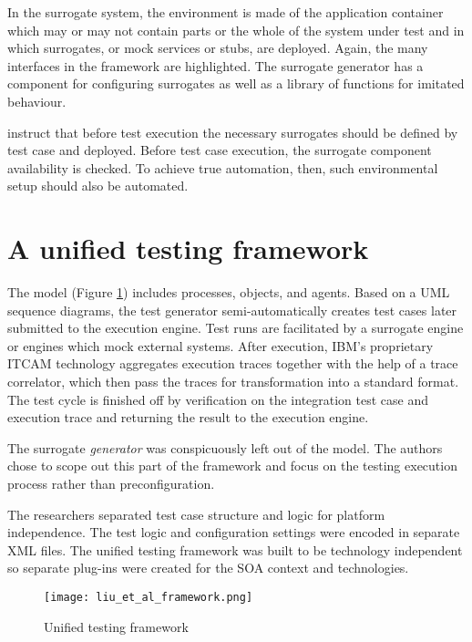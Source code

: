 \documentclass[12pt,a4paper,oneside,pdftex]{report}
\begin{document}
In the surrogate system, the environment is made of the application container which may or may not contain parts or the whole of the system under test and in which surrogates, or mock services or stubs, are deployed. Again, the many interfaces in the framework are highlighted. The surrogate generator has a component for configuring surrogates as well as a library of functions for imitated behaviour.

\citet{huang2008surrogate} instruct that before test execution the necessary surrogates should be defined by test case and deployed. Before test case execution, the surrogate component availability is checked. To achieve true automation, then, such environmental setup should also be automated.


\section{A unified testing framework}

The \citet{liu2009unified} model (Figure \ref{fig:liu}) includes processes, objects, and agents. Based on a UML sequence diagrams, the test generator semi-automatically creates test cases later submitted to the execution engine. Test runs are facilitated by a surrogate engine or engines which mock external systems. After execution, IBM's proprietary ITCAM technology aggregates execution traces together with the help of a trace correlator, which then pass the traces for transformation into a standard format. The test cycle is finished off by verification on the integration test case and execution trace and returning the result to the execution engine.

The surrogate \emph{generator} was conspicuously left out of the model. The authors chose to scope out this part of the framework and focus on the testing execution process rather than preconfiguration.

The researchers separated test case structure and logic for platform independence. The test logic and configuration settings were encoded in separate XML files. The unified testing framework was built to be technology independent so 
separate plug-ins were created for the SOA context and technologies.

\begin{figure}[H]
  \begin{center}
    \texttt{[image: liu\_et\_al\_framework.png]}
    \caption{Unified testing framework \citep{liu2009unified}}
    \label{fig:liu}
  \end{center}
\end{figure}
\end{document}
